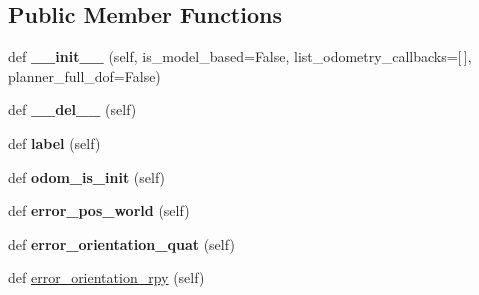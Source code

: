 \subsection*{Public Member Functions}
\begin{DoxyCompactItemize}
\item 
\mbox{\label{classuuv__control__interfaces_1_1dp__controller__base_1_1DPControllerBase_a644ded1159688da231d1e76062e8c2ad}} 
def {\bfseries \+\_\+\+\_\+init\+\_\+\+\_\+} (self, is\+\_\+model\+\_\+based=False, list\+\_\+odometry\+\_\+callbacks=\mbox{[}$\,$\mbox{]}, planner\+\_\+full\+\_\+dof=False)
\item 
\mbox{\label{classuuv__control__interfaces_1_1dp__controller__base_1_1DPControllerBase_afda5206a37fdd9ee99abdc11b64a32e6}} 
def {\bfseries \+\_\+\+\_\+del\+\_\+\+\_\+} (self)
\item 
\mbox{\label{classuuv__control__interfaces_1_1dp__controller__base_1_1DPControllerBase_a488b87b40157ffd1cd48d4103f734051}} 
def {\bfseries label} (self)
\item 
\mbox{\label{classuuv__control__interfaces_1_1dp__controller__base_1_1DPControllerBase_a78abc01e4ed3b1d8339c7aa1b12caf1e}} 
def {\bfseries odom\+\_\+is\+\_\+init} (self)
\item 
\mbox{\label{classuuv__control__interfaces_1_1dp__controller__base_1_1DPControllerBase_ac3b8069a7903de25a608ebe8a23cf304}} 
def {\bfseries error\+\_\+pos\+\_\+world} (self)
\item 
\mbox{\label{classuuv__control__interfaces_1_1dp__controller__base_1_1DPControllerBase_afa7ca2e5aabf28567c733396aaefcc0a}} 
def {\bfseries error\+\_\+orientation\+\_\+quat} (self)
\item 
def \hyperlink{classuuv__control__interfaces_1_1dp__controller__base_1_1DPControllerBase_a17876e9bc0c1dd2b0150e46b05cab56e}{error\+\_\+orientation\+\_\+rpy} (self)

\end{DoxyCompactItemize}
